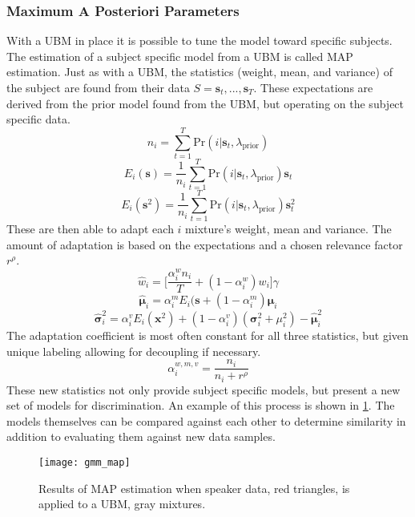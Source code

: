 \subsubsection{Maximum A Posteriori Parameters}

With a \ac{UBM} in place it is possible to tune the model toward specific subjects. The estimation of a subject specific model from a \ac{UBM} is called \ac{MAP} estimation\cite{Reynolds2009}. Just as with a \ac{UBM}, the statistics (weight, mean, and variance) of the subject are found from their data $S={\bm{s}_{t},...,\bm{s}_{T}}$. These expectations are derived from the prior model found from the \ac{UBM}, but operating on the subject specific data.
\begin{equation}
n_{i} = \sum_{t=1}^{T}\text{Pr}(i|\bm{s}_{t},\lambda_{\text{prior}})
\end{equation}
\begin{equation}
E_{i}(\bm{s}) = \frac{1}{n_{i}} \sum_{t=1}^{T}\text{Pr}(i|\bm{s}_{t},\lambda_{\text{prior}})\bm{s}_{t}
\end{equation}
\begin{equation}
E_{i}(\bm{s}^{2}) = \frac{1}{n_{i}} \sum_{t=1}^{T}\text{Pr}(i|\bm{s}_{t},\lambda_{\text{prior}})\bm{s}_{t}^{2}
\end{equation}
These are then able to adapt each $i$ mixture's weight, mean and variance. The amount of adaptation is based on the expectations and a chosen relevance factor $r^{\rho}$.
\begin{equation}
\hat{w}_{i} = \Big[\frac{\alpha_{i}^{w}n_{i}}{T}+(1-\alpha_{i}^{w})w_{i}\Big]\gamma
\end{equation}
\begin{equation}
\hat{\bm{\mu}}_{i} = \alpha_{i}^{m}E_{i}(\bm{s}+(1-\alpha_{i}^{m})\bm{\mu}_{i}
\end{equation}
\begin{equation}
\hat{\bm{\sigma}}_{i}^{2} = \alpha_{i}^{v}E_{i}(\bm{x}^{2})+(1-\alpha_{i}^{v})(\bm{\sigma}_{i}^{2}+\mu_{i}^{2})-\hat{\bm{\mu}}_{i}^{2}
\end{equation}
The adaptation coefficient is most often constant for all three statistics, but given unique labeling allowing for decoupling if necessary.
\begin{equation}
\alpha_{i}^{w,m,v} = \frac{n_{i}}{n_{i}+r^{\rho}}
\end{equation}
These new statistics not only provide subject specific models, but present a new set of models for discrimination. An example of this process is shown in \cref{fig:gmm_map}. The models themselves can be compared against each other to determine similarity in addition to evaluating them against new data samples.
\begin{figure}[ht]
\centering
\texttt{[image: gmm\_map]}
\caption[Example of MAP of GMM]{Results of MAP estimation when speaker data, red triangles, is applied to a UBM, gray mixtures.}
\label{fig:gmm_map}
\end{figure}

